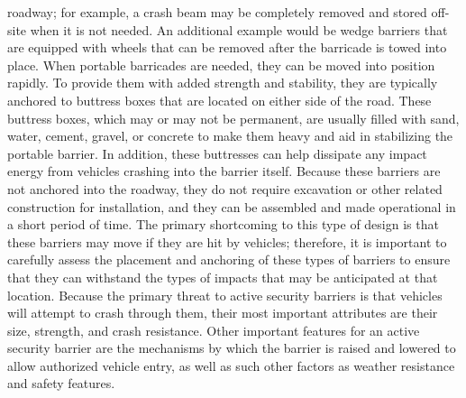 \documentclass{article}
\begin{document}
roadway; for example, a crash beam may be completely removed and stored
off-site when it is not needed. An additional example would be wedge
barriers that are equipped with wheels that can be removed after the
barricade is towed into place. When portable barricades are needed, they
can be moved into position rapidly. To provide them with added strength
and stability, they are typically anchored to buttress boxes that are
located on either side of the road. These buttress boxes, which may or
may not be permanent, are usually filled with sand, water, cement,
gravel, or concrete to make them heavy and aid in stabilizing the
portable barrier. In addition, these buttresses can help dissipate any
impact energy from vehicles crashing into the barrier itself. Because
these barriers are not anchored into the roadway, they do not require
excavation or other related construction for installation, and they can
be assembled and made operational in a short period of time. The primary
shortcoming to this type of design is that these barriers may move if
they are hit by vehicles; therefore, it is important to carefully assess
the placement and anchoring of these types of barriers to ensure that
they can withstand the types of impacts that may be anticipated at that
location. Because the primary threat to active security barriers is that
vehicles will attempt to crash through them, their most important
attributes are their size, strength, and crash resistance. Other
important features for an active security barrier are the mechanisms by
which the barrier is raised and lowered to allow authorized vehicle
entry, as well as such other factors as weather resistance and safety
features.
\end{document}
